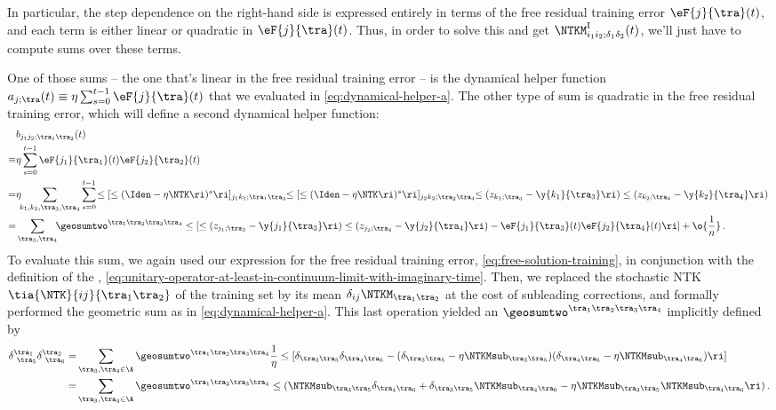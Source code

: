 In particular, the step dependence on the right-hand side is expressed entirely in terms of the free residual training error $\eF{j}{\tra}(t)$, and each term is either 
linear or quadratic in $\eF{j}{\tra}(t)$.
Thus, in order to solve this  and get $\NTKM^{\text{I}}_{i_1i_2;\delta_1\delta_2}(t)$, we'll just have to compute sums over these terms.







One of those sums -- the one that's linear in the free residual training error -- is the dynamical helper function $a_{j;\tra}(t)\equiv\eta\sum_{s=0}^{t-1}\eF{j}{\tra}(t)$ that we evaluated in \eqref{eq:dynamical-helper-a}.
The other type of sum is quadratic in the free residual training error, which will define a second dynamical helper function:
\begin{align}\label{eq:dynamical-helper-b}
 &b_{j_1j_2;\tra_1\tra_2}(t)\, \\
\equiv&\eta\sum_{s=0}^{t-1}\eF{j_1}{\tra_1}(t)\eF{j_2}{\tra_2}(t)\, \notag\\
=&\eta\!\!\sum_{k_1,k_2,\tra_3,\tra_4}\sum_{s=0}^{t-1}\!\le[ \le(\Iden-\eta\NTK\ri)^{s}\ri]_{j_1k_1;\tra_1\tra_3}\!\!\le[ \le(\Iden-\eta\NTK\ri)^{s}\ri]_{j_2k_2;\tra_2\tra_4}\!\!\le(z_{k_1;\tra_3}-\y{k_1}{\tra_3}\ri)\le(z_{k_2;\tra_4}-\y{k_2}{\tra_4}\ri)\, \notag\\
=&\sum_{\tra_3,\tra_4}\!\!\geosumtwo^{\tra_1\tra_2\tra_3\tra_4}\le[\le(z_{j_1;\tra_3}-\y{j_1}{\tra_3}\ri)\le(z_{j_2;\tra_4}-\y{j_2}{\tra_4}\ri) -\eF{j_1}{\tra_3}(t)\eF{j_2}{\tra_4}(t)\ri]+\o{\frac{1}{n}}\, .\notag
\end{align}
To evaluate this sum, we again used our expression for the free residual training error, \eqref{eq:free-solution-training}, in conjunction with the definition of the , \eqref{eq:unitary-operator-at-least-in-continuum-limit-with-imaginary-time}. Then, we replaced the stochastic NTK $\tia{\NTK}{ij}{\tra_1\tra_2}$ of the training set by its mean $\delta_{ij}\NTKM_{\tra_1\tra_2}$ at the cost of subleading corrections, and formally performed the geometric sum as in \eqref{eq:dynamical-helper-a}. This last operation yielded an 
$\geosumtwo^{\tra_1\tra_2\tra_3\tra_4}$ implicitly defined by
\begin{align}
\delta^{\tra_1}_{\ \tra_5}\delta^{\tra_2}_{\ \tra_6}=&\sum_{\tra_3,\tra_4\in\A}\geosumtwo^{\tra_1\tra_2\tra_3\tra_4}\frac{1}{\eta}\le[\delta_{\tra_3\tra_5}\delta_{\tra_4\tra_6}-(\delta_{\tra_3\tra_5}-\eta\NTKMsub_{\tra_3\tra_5})(\delta_{\tra_4\tra_6}-\eta\NTKMsub_{\tra_4\tra_6})\ri]\, \notag\\
=&\sum_{\tra_3,\tra_4\in\A}\geosumtwo^{\tra_1\tra_2\tra_3\tra_4}\le(\NTKMsub_{\tra_3\tra_5}\delta_{\tra_4\tra_6}+\delta_{\tra_3\tra_5}\NTKMsub_{\tra_4\tra_6}-\eta\NTKMsub_{\tra_3\tra_5}\NTKMsub_{\tra_4\tra_6}\ri)\, .\label{eq:implicit-X-tensor}
\end{align}
